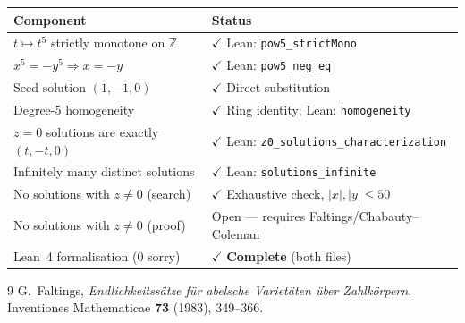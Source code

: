 \documentclass[12pt,a4paper]{article}
\theoremstyle{definition}
\newcommand{\Z}{\mathbb{Z}}
\begin{document}
\begin{center}
\begin{tabular}{ll}
  \toprule
  Component & Status \\
  \midrule
  $t \mapsto t^5$ strictly monotone on $\Z$ & $\checkmark$ Lean: \texttt{pow5\_strictMono} \\
  $x^5 = -y^5 \Rightarrow x = -y$ & $\checkmark$ Lean: \texttt{pow5\_neg\_eq} \\
  Seed solution $(1,-1,0)$ & $\checkmark$ Direct substitution \\
  Degree-5 homogeneity & $\checkmark$ Ring identity; Lean: \texttt{homogeneity} \\
  $z=0$ solutions are exactly $(t,-t,0)$ & $\checkmark$ Lean: \texttt{z0\_solutions\_characterization} \\
  Infinitely many distinct solutions & $\checkmark$ Lean: \texttt{solutions\_infinite} \\
  No solutions with $z \neq 0$ (search) & $\checkmark$ Exhaustive check, $|x|,|y| \leq 50$ \\
  No solutions with $z \neq 0$ (proof) & Open --- requires Faltings/Chabauty--Coleman \\
  Lean~4 formalisation (0 sorry) & $\checkmark$ \textbf{Complete} (both files) \\
  \bottomrule
\end{tabular}
\end{center}

\begin{thebibliography}{9}
  G.~Faltings,
  \textit{Endlichkeitss\"atze f\"ur abelsche Variet\"aten \"uber Zahlk\"orpern},
  Inventiones Mathematicae \textbf{73} (1983), 349--366.
\end{thebibliography}
\end{document}
